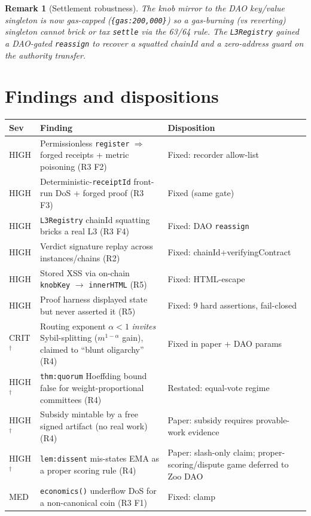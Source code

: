 \documentclass[11pt]{article}
\newtheorem{remark}{Remark}
\begin{document}
\begin{remark}[Settlement robustness]
The knob mirror to the DAO key/value singleton is now gas-capped
(\texttt{\{gas:200{,}000\}}) so a gas-\emph{burning} (vs reverting) singleton
cannot brick or tax \texttt{settle} via the 63/64 rule. The \texttt{L3Registry}
gained a DAO-gated \texttt{reassign} to recover a squatted chainId and a
zero-address guard on the authority transfer.
\end{remark}

\section{Findings and dispositions}

\begin{longtable}{@{}p{1.1cm}p{8.4cm}p{4.0cm}@{}}
\toprule
Sev & Finding & Disposition \\
\midrule
\endhead
HIGH & Permissionless \texttt{register} $\Rightarrow$ forged receipts + metric poisoning (R3 F2) & Fixed: recorder allow-list \\
HIGH & Deterministic-\texttt{receiptId} front-run DoS + forged proof (R3 F3) & Fixed (same gate) \\
HIGH & \texttt{L3Registry} chainId squatting bricks a real L3 (R3 F4) & Fixed: DAO \texttt{reassign} \\
HIGH & Verdict signature replay across instances/chains (R2) & Fixed: chainId+verifyingContract \\
HIGH & Stored XSS via on-chain \texttt{knobKey} $\to$ \texttt{innerHTML} (R5) & Fixed: HTML-escape \\
HIGH & Proof harness displayed state but never asserted it (R5) & Fixed: 9 hard assertions, fail-closed \\
CRIT$^\dagger$ & Routing exponent $\alpha<1$ \emph{invites} Sybil-splitting ($m^{1-\alpha}$ gain), claimed to ``blunt oligarchy'' (R4) & Fixed in paper + DAO params \\
HIGH$^\dagger$ & \texttt{thm:quorum} Hoeffding bound false for weight-proportional committees (R4) & Restated: equal-vote regime \\
HIGH$^\dagger$ & Subsidy mintable by a free signed artifact (no real work) (R4) & Paper: subsidy requires provable-work evidence \\
HIGH$^\dagger$ & \texttt{lem:dissent} mis-states EMA as a proper scoring rule (R4) & Paper: slash-only claim; proper-scoring/dispute game deferred to Zoo DAO \\
MED & \texttt{economics()} underflow DoS for a non-canonical coin (R3 F1) & Fixed: clamp \\

\end{longtable}
\end{document}
